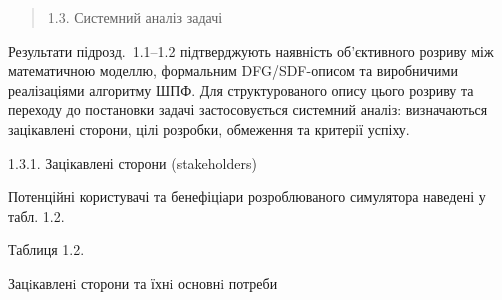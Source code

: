 \documentclass[
]{article}
\begin{document}
\begin{quote}
\protect{}\label{ux441ux438ux441ux442ux435ux43cux43dux438ux439-ux430ux43dux430ux43bux456ux437-ux437ux430ux434ux430ux447ux456}{}1.3.
Системний аналіз задачі
\end{quote}

Результати підрозд.~1.1--1.2 підтверджують наявність об'єктивного
розриву між математичною моделлю, формальним DFG/SDF-описом та
виробничими реалізаціями алгоритму ШПФ. Для структурованого опису цього
розриву та переходу до постановки задачі застосовується системний
аналіз: визначаються зацікавлені сторони, цілі розробки, обмеження та
критерії успіху.

1.3.1. Зацікавлені сторони (stakeholders)

Потенційні користувачі та бенефіціари розроблюваного симулятора наведені
у табл. 1.2.

Таблиця 1.2.

Зацiкавленi сторони та їхнi основнi потреби
\end{document}
